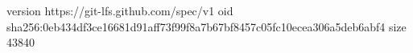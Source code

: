 version https://git-lfs.github.com/spec/v1
oid sha256:0eb434df3ce16681d91aff73f99f8a7b67bf8457c05fc10ecea306a5deb6abf4
size 43840
